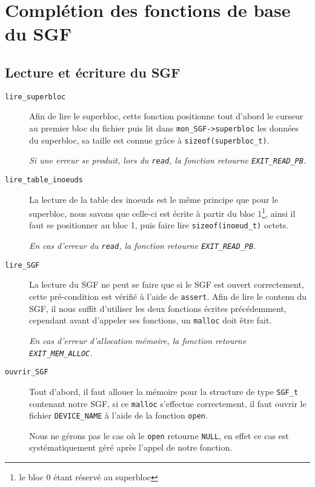 \documentclass[a4paper, 11pt]{article}
\begin{document}
	\maketitle
	\setcounter{secnumdepth}{2}
	\section{Complétion des fonctions de base du SGF}
		\subsection{Lecture et écriture du SGF}
		\begin{description}
			\item[\texttt{lire\_superbloc}] Afin de lire le superbloc, cette fonction positionne tout d'abord le curseur au premier bloc du fichier puis lit dans
				\texttt{mon\_SGF->superbloc} les données du superbloc, sa taille est connue grâce à \texttt{sizeof(superbloc\_t)}. 
				
				\textit{Si une erreur se produit, lors du \texttt{read}, la fonction retourne \texttt{EXIT\_READ\_PB}.}
			\item[\texttt{lire\_table\_inoeuds}] La lecture de la table des inoeuds est le même principe que pour le superbloc, nous savons que celle-ci est écrite
				à partir du bloc 1\footnote{le bloc 0 étant réservé au superbloc}, ainsi il faut se positionner au bloc 1, puis faire lire \texttt{sizeof(inoeud\_t)}
				octets. 
				
				\textit{En cas d'erreur du \texttt{read}, la fonction retourne \texttt{EXIT\_READ\_PB}.}
			\item[\texttt{lire\_SGF}] La lecture du SGF ne peut se faire que si le SGF est ouvert correctement, cette pré-condition est vérifié à l'aide de
				\texttt{assert}. Afin de lire le contenu du SGF, il nous suffit d'utiliser les deux fonctions écrites précédemment, cependant avant d'appeler
				ses fonctions, un \texttt{malloc} doit être fait. 
				
				\textit{En cas d'erreur d'allocation mémoire, la fonction retourne \texttt{EXIT\_MEM\_ALLOC}.}
			\item[\texttt{ouvrir\_SGF}] Tout d'abord, il faut allouer la mémoire pour la structure de type \texttt{SGF\_t} contenant notre SGF, si ce
				\texttt{malloc}
				s'effectue correctement, il faut ouvrir le fichier \texttt{DEVICE\_NAME} à l'aide de la fonction \texttt{open}.

				Nous ne gérons pas le cas où le \texttt{open} retourne \texttt{NULL}, en effet ce cas est systématiquement géré après l'appel de notre fonction.
		\end{description}
\end{document}
